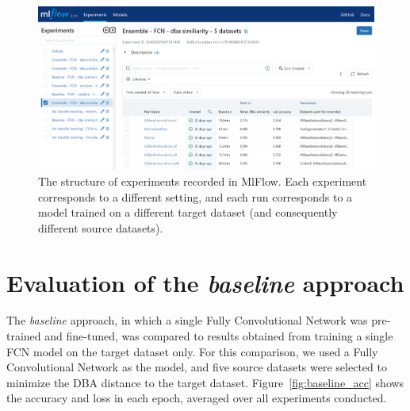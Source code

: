 \documentclass[a4paper,11pt,twoside]{report}
\theoremstyle{definition}
\begin{document}
\begin{figure}[h!t]
\centering
\includegraphics[width=17cm]{imgs/mlflow_screenshot.png}
\caption{The structure of experiments recorded in MlFlow. Each experiment corresponds to a different setting, and each run corresponds to a model trained on a different target dataset (and consequently different source datasets).}
\label{fig:mlflow_screnshot}
\end{figure}
\FloatBarrier
\section{Evaluation of the \textit{baseline} approach}
The \textit{baseline} approach, in which a single Fully Convolutional Network was pre-trained and fine-tuned, was compared to results obtained from training a single FCN model on the target dataset only. For this comparison, we used a Fully Convolutional Network as the model, and five source datasets were selected to minimize the DBA distance to the target dataset. Figure~\ref{fig:baseline_acc} shows the accuracy and loss in each epoch, averaged over all experiments conducted.


\FloatBarrier
\end{document}
